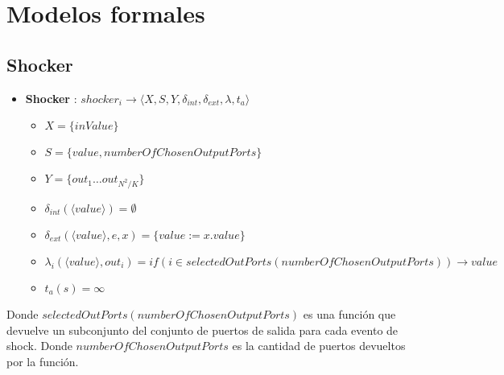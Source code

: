 \section{Modelos formales}
\subsection{Shocker}
\begin{itemize}

	\item \textbf{Shocker} : $ shocker_i \rightarrow \langle X, S, Y, \delta_{int}, \delta_{ext}, \lambda, t_{a} \rangle$ \newline
	\begin{itemize}
		\item $ X = \{ inValue \} $ \newline
		\item $ S = \{ value, numberOfChosenOutputPorts \} $ \newline
		\item $ Y = \{ out_1 \dots out_{N^2/K} \} $ \newline
		\item $ \delta_{int}(\langle value \rangle) = \emptyset $ \newline
		\item $ \delta_{ext} (\langle value \rangle, e, x)= \{ value := x.value \} $ \newline
		\item $ \lambda_i(\langle value \rangle, out_i) = if (i \in selectedOutPorts(numberOfChosenOutputPorts)) \rightarrow value $ \newline
		\item $ t_{a}(s) = \infty $ 
	\end{itemize}
\end{itemize}

Donde $selectedOutPorts(numberOfChosenOutputPorts)$ es una función que devuelve un subconjunto del conjunto de puertos de salida para cada evento de shock. Donde $numberOfChosenOutputPorts$ es la cantidad de puertos devueltos por la función. 